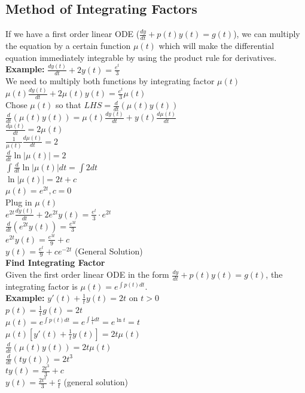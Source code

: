 \documentclass{article}
\begin{document}
\subsection{Method of Integrating Factors}
\label{sec:fintegratefactor}
If we have a first order linear ODE ($\frac{dy}{dt}+p(t)y(t)=g(t)$), we can multiply the equation by a certain function $\mu(t)$ which will make the differential equation immediately integrable by using the product rule for derivatives.\\
\textbf{Example:} $\frac{dy(t)}{dt}+2y(t)=\frac{e^t}{3}$\\
We need to multiply both functions by integrating factor $\mu(t)$\\
$\mu(t)\frac{dy(t)}{dt}+2\mu(t)y(t)=\frac{e^t}{3}\mu(t)$\\
Chose $\mu(t)$ so that $LHS=\frac{d}{dt}(\mu(t)y(t))$\\
$\frac{d}{dt}(\mu(t)y(t))=\mu(t)\frac{dy(t)}{dt}+y(t)\frac{d\mu(t)}{dt}$\\
$\frac{d\mu(t)}{dt}=2\mu(t)$\\
$\frac{1}{\mu(t)}\frac{d\mu(t)}{dt}=2$\\
$\frac{d}{dt}\ln\vert \mu(t)\vert=2$\\
$\int\frac{d}{dt}\ln\vert \mu(t)\vert dt=\int 2dt$\\
$\ln\vert \mu(t)\vert =2t+c$\\
$\mu(t)=e^{2t}, c=0$\\
Plug in $\mu(t)$\\
$e^{2t}\frac{dy(t)}{dt}+2e^{2t}y(t)=\frac{e^t}{3}\cdot e^{2t}$\\
$\frac{d}{dt}(e^{2t}y(t))=\frac{e^{3t}}{3}$\\
$e^{2t}y(t)=\frac{e^{3t}}{9}+c$\\
$y(t)=\frac{e^t}{9}+ce^{-2t}$ (General Solution)\\
\newline
\textbf{Find Integrating Factor}\\
Given the first order linear ODE in the form $\frac{dy}{dt}+p(t)y(t)=g(t)$, the integrating factor is $\mu(t)=e^{\int p(t)dt}$.\\
\textbf{Example:} $y'(t)+\frac{1}{t}y(t)=2t$ on $t>0$\\
$p(t)=\frac{1}{t}$\hspace*{0.5in}$g(t)=2t$\\
$\mu(t)=e^{\int p(t)dt}=e^{\int\frac{1}{t}dt}=e^{\ln t}=t$\\
$\mu(t)[y'(t)+\frac{1}{t}y(t)]=2t\mu(t)$\\
$\frac{d}{dt}(\mu(t)y(t))=2t\mu(t)$\\
$\frac{d}{dt}(ty(t))=2t^3$\\
$ty(t)=\frac{2t^3}{3}+c$\\
$y(t)=\frac{2t^2}{3}+\frac{c}{t}$ (general solution)
\end{document}
